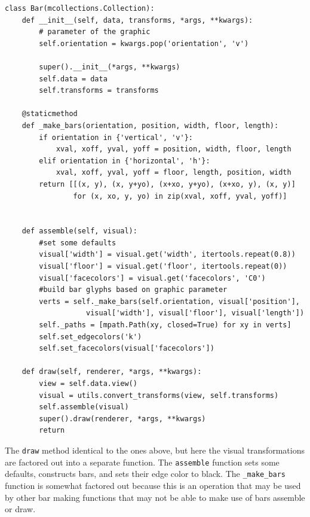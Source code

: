 \documentclass[../main.tex]{subfiles}
\begin{document}
\begin{verbatim}
class Bar(mcollections.Collection):
    def __init__(self, data, transforms, *args, **kwargs):
        # parameter of the graphic
        self.orientation = kwargs.pop('orientation', 'v')

        super().__init__(*args, **kwargs)
        self.data = data
        self.transforms = transforms

    @staticmethod    
    def _make_bars(orientation, position, width, floor, length):
        if orientation in {'vertical', 'v'}:
            xval, xoff, yval, yoff = position, width, floor, length
        elif orientation in {'horizontal', 'h'}:
            xval, xoff, yval, yoff = floor, length, position, width
        return [[(x, y), (x, y+yo), (x+xo, y+yo), (x+xo, y), (x, y)] 
                for (x, xo, y, yo) in zip(xval, xoff, yval, yoff)]

    
    def assemble(self, visual):
        #set some defaults
        visual['width'] = visual.get('width', itertools.repeat(0.8))
        visual['floor'] = visual.get('floor', itertools.repeat(0))
        visual['facecolors'] = visual.get('facecolors', 'C0')
        #build bar glyphs based on graphic parameter
        verts = self._make_bars(self.orientation, visual['position'], 
                   visual['width'], visual['floor'], visual['length'])
        self._paths = [mpath.Path(xy, closed=True) for xy in verts]
        self.set_edgecolors('k')
        self.set_facecolors(visual['facecolors'])
        
    def draw(self, renderer, *args, **kwargs):
        view = self.data.view()
        visual = utils.convert_transforms(view, self.transforms)  
        self.assemble(visual)
        super().draw(renderer, *args, **kwargs)
        return      
\end{verbatim}
The \texttt{draw} method identical to the ones above, but here the visual transformations are factored out into a separate function. The \texttt{assemble} function sets some defaults, constructs bars, and sets their edge color to black. The \texttt{_make_bars} function is somewhat factored out because this is an operation that may be used by other bar making functions that may not be able to make use of bars assemble or draw. 
\end{document}
